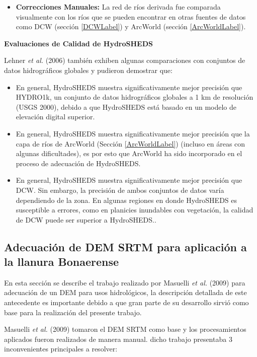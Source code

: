 \documentclass[10pt,a4paper, twoside]{report}
\begin{document}
\begin{itemize}
	\item \textbf{Correcciones Manuales:} La red de ríos derivada fue comparada visualmente con los ríos que se pueden encontrar en otras fuentes de datos como DCW (sección \ref{DCWLabel}) y ArcWorld (sección \ref{ArcWorldLabel}). 
	
\end{itemize}


\textbf{Evaluaciones de Calidad de HydroSHEDS}

Lehner \textit{et al.} (2006) también exhiben algunas comparaciones con conjuntos de datos hidrográficos globales y pudieron demostrar que:

\begin{itemize}
	\item En general, HydroSHEDS muestra significativamente mejor precisión que HYDRO1k, un conjunto de datos hidrográficos globales a 1 km de resolución (USGS 2000), debido a que HydroSHEDS está basado en un modelo de elevación digital superior.
	\item En general, HydroSHEDS muestra significativamente mejor precisión que la capa de ríos de ArcWorld (Sección \ref{ArcWorldLabel}) (incluso en áreas con algunas dificultades), es por esto que ArcWorld ha sido incorporado en el proceso de adecuación de HydroSHEDS.
	\item En general, HydroSHEDS muestra significativamente mejor precisión que DCW. Sin embargo, la precisión de ambos conjuntos de datos varía dependiendo de la zona. En algunas regiones en donde HydroSHEDS es susceptible a errores, como en planicies inundables con vegetación, la calidad de DCW puede ser superior a HydroSHEDS..
\end{itemize}



\subsection{Adecuación de DEM SRTM para aplicación a la llanura Bonaerense}
\label{trabajoSergioAntecedente}

En esta sección se describe el trabajo realizado por Masuelli \textit{et al.} (2009) para adecuación de un DEM para usos hidrológicos, la descripción detallada de este antecedente es importante debido a que gran parte de su desarrollo sirvió como base para la realización del presente trabajo.

Masuelli \textit{et al.} (2009) tomaron el DEM SRTM como base y los procesamientos aplicados fueron realizados de manera manual. dicho trabajo presentaba 3 inconvenientes principales a resolver:
\end{document}
